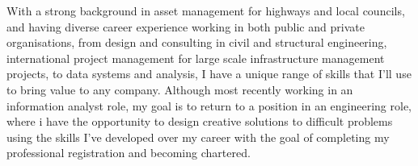 %
%
%
\par{With a strong background in asset management for highways and local councils, and having diverse career experience working in both public and private organisations, from design and consulting in civil and structural engineering, international project management for large scale infrastructure management projects, to data systems and analysis, I have a unique range of skills that I'll use to bring value to any company. Although most recently working in an information analyst role, my goal is to return to a position in an engineering role, where i have the opportunity to design creative solutions to difficult problems using the skills I’ve developed over my career with the goal of completing my professional registration and becoming chartered. \\

}